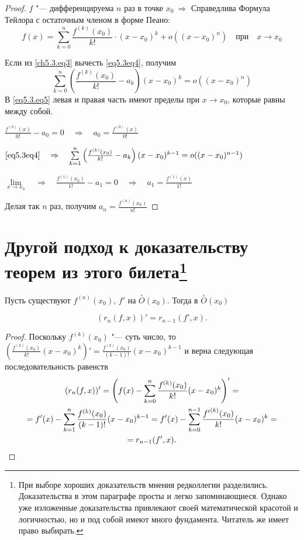 \begin{proof}
$f$ "--- дифференцируема $n$ раз в точке $x_0 \ \Rightarrow$
Справедлива Формула Тейлора с остаточным членом в форме Пеано:
\begin{equation} \label{eq5.3eq4}
f(x) = \sum_{k = 0}^{n} \frac{f^{(k)}(x_0)}{k!} \cdot (x - x_0)^k + o((x - x_0)^n) \quad \text{при} \quad x \to x_0
\end{equation}

Если из \eqref{ch5.3.eq3} вычесть \eqref{eq5.3eq4}, получим
\begin{equation} \label{eq5.3.eq5}
\sum\limits_{k = 0}^{n} \left( \frac{f^{(k)}(x_0)}{k!} - a_k \right) (x - x_0)^k = o((x - x_0)^n)
\end{equation}
В \eqref{eq5.3.eq5} левая и правая часть имеют пределы при $x \to x_0$, которые равны между собой.

$\frac{f^{(0)}(x)}{0!} - a_0 = 0 \quad \Rightarrow \quad a_0 = \frac{f^{(0)}(x)}{0!}$

$\eqref{eq5.3eq4} \quad \Rightarrow \quad \sum\limits_{k = 1}^{n} \left( \frac{f^{(k)}(x_0)}{k!} - a_k \right) (x - x_0)^{k - 1} = o((x - x_0)^{n - 1})$

$\lim\limits_{x \to x_0} \quad \Rightarrow \quad \frac{f^{(1)}(x_0)}{1!} - a_1 = 0 \quad \Rightarrow \quad a_1 = \frac{f^{(1)}(x)}{1!}$

Делая так $n$ раз, получим $a_n = \frac{f^{(n)}(x_0)}{n!}$
\end{proof}


\section[Другой подход к доказательству теорем из этого билета]{Другой подход к доказательству теорем из этого билета\footnote{При выборе хороших доказательств мнения редколлегии разделились. Доказательства в этом параграфе просты и легко запоминающиеся. Однако уже изложенные доказательства привлекают своей математической красотой и логичностью, но и под собой имеют много фундамента. Читатель же имеет право выбирать.}}

\begin{lemm}\label{ch5:simplemm}
Пусть существуют $f^{(n)}(x_0)$, $f'$ на $\overset{\circ}{O}(x_0)$. Тогда в $\overset{\circ}{O}(x_0)$

$$
(r_n(f,x))'=r_{n-1}(f',x).
$$
\end{lemm}
\begin{proof}
Поскольку $f^{(k)}(x_0)$ "--- суть число, то $(\frac{f^{(k)}(x_0)}{k!} (x - x_0)^k)' =  \frac{f^{(k)}(x_0)}{(k-1)!} (x - x_0)^{k-1} $ и верна следующая последовательность равенств
\begin{multline*}
(r_n(f,x))' = \left(f(x) - \sum_{k = 0}^{n} \frac{f^{(k)}(x_0)}{k!} (x - x_0)^k \right)' =
\\ = f'(x) - \sum_{k = 1}^{n} \frac{f^{(k)}(x_0)}{(k-1)!} (x - x_0)^{k-1}= f'(x) - \sum_{k = 0}^{n-1} \frac{{f'} ^{(k)}(x_0)}{k!} (x - x_0)^k =\\=r_{n-1}(f',x). \qedhere
\end{multline*}
\end{proof}

